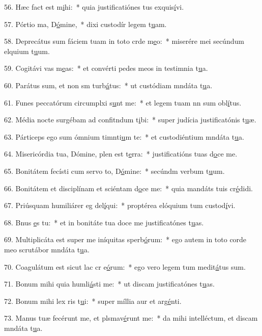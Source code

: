 56. Hæc fact est m\uline{i}hi:~* quia justificatiónes tus exquis\uline{í}vi.\par 
57. Pórtio ma, D\uline{ó}mine,~* dixi custodír legem t\uline{u}am.\par 
58. Deprecátus sum fáciem tuam in toto crde m\uline{e}o:~* miserére mei secúndum elquium t\uline{u}um.\par 
59. Cogitávi vas m\uline{e}as:~* et convérti pedes meos in testimnia t\uline{u}a.\par 
60. Parátus sum, et non sm turb\uline{á}tus:~* ut custódiam mndáta t\uline{u}a.\par 
61. Funes peccatórum circumplxi s\uline{u}nt me:~* et legem tuam nn sum obl\uline{í}tus.\par 
62. Média nocte surgébam ad confitndum t\uline{i}bi:~* super judícia justificatónis t\uline{u}æ.\par 
63. Párticeps ego sum ómnium timnti\uline{u}m te:~* et custodiéntium mndáta t\uline{u}a.\par 
64. Misericórdia tua, Dómine, plen est t\uline{e}rra:~* justificatións tuas d\uline{o}ce me.\par 
65. Bonitátem fecísti cum servo to, D\uline{ó}mine:~* secúndm verbum t\uline{u}um.\par 
66. Bonitátem et disciplínam et sciéntam d\uline{o}ce me:~* quia mandáts tuis cr\uline{é}didi.\par 
67. Priúsquam humiliárer eg del\uline{í}qui:~* proptérea elóquium tum custod\uline{í}vi.\par 
68. Bnus \uline{e}s tu:~* et in bonitáte tua doce me justificatónes t\uline{u}as.\par 
69. Multiplicáta est super me iníquitas sperb\uline{ó}rum:~* ego autem in toto corde meo scrutábor mndáta t\uline{u}a.\par 
70. Coagulátum est sicut lac cr e\uline{ó}rum:~* ego vero legem tum medit\uline{á}tus sum.\par 
71. Bonum mihi quia humli\uline{á}sti me:~* ut discam justificatónes t\uline{u}as.\par 
72. Bonum mihi lex ris t\uline{u}i:~* super míllia aur et arg\uline{é}nti.\par 
73. Manus tuæ fecérunt me, et plsmav\uline{é}runt me:~* da mihi intelléctum, et discam mndáta t\uline{u}a.\par 
